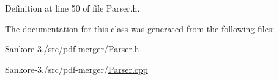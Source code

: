 Definition at line 50 of file Parser.\-h.



The documentation for this class was generated from the following files\-:\begin{DoxyCompactItemize}
\item 
Sankore-\/3./src/pdf-\/merger/\hyperlink{_parser_8h}{Parser.\-h}\item 
Sankore-\/3./src/pdf-\/merger/\hyperlink{_parser_8cpp}{Parser.\-cpp}\end{DoxyCompactItemize}
